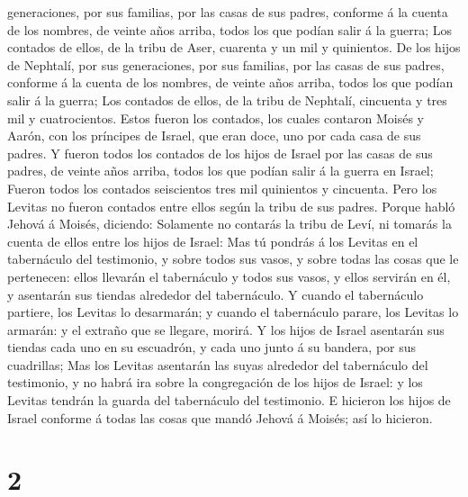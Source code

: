 generaciones, por sus familias, por las casas de sus padres, conforme á
la cuenta de los nombres, de veinte años arriba, todos los que podían
salir á la guerra;  Los contados de ellos, de la tribu de
Aser, cuarenta y un mil y quinientos.  De los hijos de
Nephtalí, por sus generaciones, por sus familias, por las casas de sus
padres, conforme á la cuenta de los nombres, de veinte años arriba,
todos los que podían salir á la guerra;  Los contados de
ellos, de la tribu de Nephtalí, cincuenta y tres mil y cuatrocientos.
 Estos fueron los contados, los cuales contaron Moisés y
Aarón, con los príncipes de Israel, que eran doce, uno por cada casa de
sus padres.  Y fueron todos los contados de los hijos de
Israel por las casas de sus padres, de veinte años arriba, todos los que
podían salir á la guerra en Israel;  Fueron todos los
contados seiscientos tres mil quinientos y cincuenta.  Pero
los Levitas no fueron contados entre ellos según la tribu de sus padres.
 Porque habló Jehová á Moisés, diciendo: 
Solamente no contarás la tribu de Leví, ni tomarás la cuenta de ellos
entre los hijos de Israel:  Mas tú pondrás á los Levitas en
el tabernáculo del testimonio, y sobre todos sus vasos, y sobre todas
las cosas que le pertenecen: ellos llevarán el tabernáculo y todos sus
vasos, y ellos servirán en él, y asentarán sus tiendas alrededor del
tabernáculo.  Y cuando el tabernáculo partiere, los Levitas
lo desarmarán; y cuando el tabernáculo parare, los Levitas lo armarán: y
el extraño que se llegare, morirá.  Y los hijos de Israel
asentarán sus tiendas cada uno en su escuadrón, y cada uno junto á su
bandera, por sus cuadrillas;  Mas los Levitas asentarán las
suyas alrededor del tabernáculo del testimonio, y no habrá ira sobre la
congregación de los hijos de Israel: y los Levitas tendrán la guarda del
tabernáculo del testimonio.  E hicieron los hijos de Israel
conforme á todas las cosas que mandó Jehová á Moisés; así lo hicieron.

\hypertarget{section-1}{%
\section{2}\label{section-1}}

